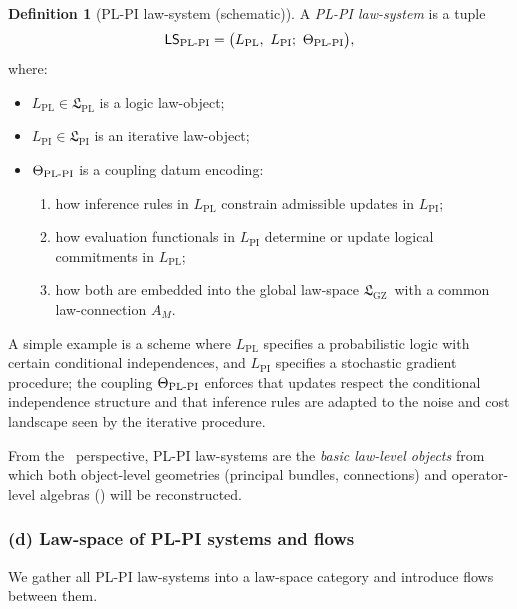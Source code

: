 \documentclass[11pt]{book}
\theoremstyle{plain}
\theoremstyle{definition}
\newtheorem{definition}[theorem]{Definition} \theoremstyle{remark}
\newcommand{\PLPIMMT}{\text{PL-PI MMT}}
\newcommand{\GZLS}{\ensuremath{\mathfrak{L}_{\mathrm{GZ}}}}       \newcommand{\GZLT}{\ensuremath{M_{!w}}}                           \newcommand{\GZLOC}{\ensuremath{A_M}}                             \newcommand{\GZLCurv}{\ensuremath{\mathcal{F}_{\mathrm{law}}}}
\begin{document}
\begin{definition}[PL-PI law-system (schematic)]
A \emph{PL-PI law-system} is a tuple
  \[
    \mathsf{LS}_{\mathrm{PL\text- PI}}
    =
    \bigl(
      L_{\mathrm{PL}},\ L_{\mathrm{PI}};\ \Theta_{\mathrm{PL\text- PI}}
    \bigr),
  \]
  where:
  \begin{itemize}
    \item $L_{\mathrm{PL}}\in\mathfrak{L}_{\mathrm{PL}}$ is a logic
          law-object;
    \item $L_{\mathrm{PI}}\in\mathfrak{L}_{\mathrm{PI}}$ is an
          iterative law-object;
    \item $\Theta_{\mathrm{PL\text- PI}}$ is a coupling datum
          encoding:
          \begin{enumerate}[label=\alph*)]
            \item how inference rules in $L_{\mathrm{PL}}$ constrain
                  admissible updates in $L_{\mathrm{PI}}$;
            \item how evaluation functionals in $L_{\mathrm{PI}}$
                  determine or update logical commitments in
                  $L_{\mathrm{PL}}$;
            \item how both are embedded into the global law-space
                  \GZLS\ with a common law-connection \GZLOC.
          \end{enumerate}
  \end{itemize}
\end{definition}

A simple example is a scheme where $L_{\mathrm{PL}}$ specifies a
probabilistic logic with certain conditional independences, and
$L_{\mathrm{PI}}$ specifies a stochastic gradient procedure; the
coupling $\Theta_{\mathrm{PL\text- PI}}$ enforces that updates respect
the conditional independence structure and that inference rules are
adapted to the noise and cost landscape seen by the iterative
procedure.

From the \PLPIMMT\ perspective, PL-PI law-systems are the \emph{basic
law-level objects} from which both object-level geometries (principal
bundles, connections) and operator-level algebras (\GAlgebra) will be
reconstructed.



\subsubsection*{(d) Law-space of PL-PI systems and flows}

We gather all PL-PI law-systems into a law-space category and introduce
flows between them.
\end{document}
